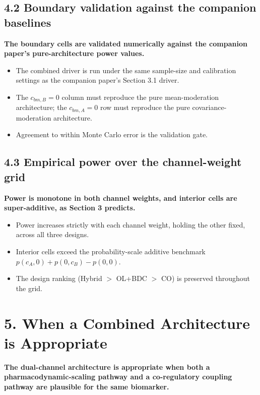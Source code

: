 \documentclass[
  11pt,
]{article}
\begin{document}
\subsection{4.2 Boundary validation against the companion baselines}

\textbf{The boundary cells are validated numerically against the
companion paper's pure-architecture power values.}

\begin{itemize}\setlength{\itemsep}{2pt}\setlength{\parskip}{0pt}
\item The combined driver is run under the same sample-size and
  calibration settings as the companion paper's Section 3.1 driver.
\item The $c_{bm,B} = 0$ column must reproduce the pure mean-moderation architecture;
  the $c_{bm,A} = 0$ row must reproduce the pure covariance-moderation architecture.
\item Agreement to within Monte Carlo error is the validation gate.
\end{itemize}

\subsection{4.3 Empirical power over the channel-weight grid}

\textbf{Power is monotone in both channel weights, and interior
cells are super-additive, as Section 3 predicts.}

\begin{itemize}\setlength{\itemsep}{2pt}\setlength{\parskip}{0pt}
\item Power increases strictly with each channel weight, holding the
  other fixed, across all three designs.
\item Interior cells exceed the probability-scale additive benchmark
  $p(c_A, 0) + p(0, c_B) - p(0, 0)$.
\item The design ranking (Hybrid $>$ OL+BDC $>$ CO) is preserved
  throughout the grid.
\end{itemize}

\section{5. When a Combined Architecture is Appropriate}

\textbf{The dual-channel architecture is appropriate when both a
pharmacodynamic-scaling pathway and a co-regulatory coupling pathway
are plausible for the same biomarker.}
\end{document}

